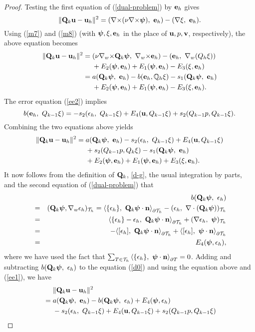 \documentclass[11pt]{amsart}
\newcommand{\bu}{{\bf u}}
\newcommand{\be}{{\bf e}}
\newcommand{\bv}{{\bf v}}
\newcommand{\bQ}{{\bf Q}}
\newcommand{\curl}{{\nabla\times}}
\newcommand{\cw}{{\nabla_w\times}}
\def\bpsi{{\boldsymbol{\psi}}}
\def\T{{\mathcal T}}
\def\Q{{\mathbb Q}}
\def\pT{{\partial T}}
\def\l{{\langle}}
\def\r{{\rangle}}
\def\bn{{\bf n}}
\def\ad#1{\begin{aligned}#1\end{aligned}}  \def\b#1{\mathbf{#1}} \def\hb#1{\hat{\mathbf{#1}}}
\def\a#1{\begin{align*}#1\end{align*}} \def\an#1{\begin{align}#1\end{align}} \def\t#1{\hbox{#1}}
\begin{document}
\begin{proof}
Testing the first equation of (\ref{dual-problem}) by $\be_h$ gives
\[
\|\bQ_k\bu-\bu_h\|^2=(\curl(\nu\curl\bpsi),\
\be_h)-(\nabla\xi,\ \be_h).
\]
Using (\ref{m7}) and (\ref{m8}) (with $\bpsi, \xi, \be_h$ in the
place of $\bu, p, \bv$, respectively), the above equation becomes
\a{ 
\|\bQ_k\bu-\bu_h\|^2  &= (\nu\cw\bQ_k\bpsi,\ \cw\be_h)-(\be_h,\ \nabla_w(Q_h\xi))\\
  & \quad \ +E_2(\bpsi, \be_h)+E_1(\bpsi, \be_h)-E_3(\xi,\be_h)\\&= a(\bQ_k \bpsi,\ \be_h)-b(\be_h,\Q_h\xi)-s_1(\bQ_k\bpsi,\ \be_h)\\
   &\quad \ +E_2(\bpsi, \be_h)+E_1(\bpsi, \be_h)-E_3(\xi,\be_h). }
The error equation (\ref{ee2}) implies
\[
b(\be_h,\ Q_{k-1}\xi)=-s_2(\epsilon_h,\ Q_{k-1}\xi)+E_4(\bu, Q_{k-1}\xi)+s_2(Q_{k-1}p,Q_{k-1}\xi).
\]
Combining the two equations above yields
\an{\ad{
\|\bQ_k\bu-\bu_h\|^2&= a(\bQ_k \bpsi,\ \be_h)-s_2(\epsilon_h,\ Q_{k-1}\xi)
     +E_4(\bu, Q_{k-1}\xi)\\
   &\quad \ +s_2(Q_{k-1}p,Q_k\xi) 
  - s_1(\bQ_k\bpsi,\ \be_h)\\
   &\quad\ +E_2(\bpsi, \be_h)+E_1(\bpsi, \be_h)+E_3(\xi,\be_h).}\label{d0} }
It now follows from the definition of $\bQ_k$, \eqref{d-g}, the usual integration by parts, and the
second equation of (\ref{dual-problem}) that
\begin{eqnarray*}
& & b(\bQ_k\bpsi,\ \epsilon_h)\\
&=&(\bQ_k\bpsi, \nabla_w\epsilon_h)_{\T_h}=\l \{\epsilon_h\},\ \bQ_k\bpsi\cdot\bn\r_{\partial\T_h}-(\epsilon_h,\ \nabla\cdot(\bQ_k\bpsi))_{\T_h}\\
&=&\l \{\epsilon_h\}-\epsilon_h,\ \bQ_k\bpsi\cdot\bn\r_{\partial\T_h}+(\nabla\epsilon_h,\ \bpsi)_{\T_h}\\
&=&-\l [\epsilon_h],\ \bQ_k\bpsi\cdot\bn\r_{\partial\T_h}+\l [\epsilon_h],\ \bpsi\cdot\bn\r_{\partial\T_h}\\
&=&E_4(\bpsi,\epsilon_h),
\end{eqnarray*}
where we have used the fact that $\sum_{T\in\T_h}\l \{\epsilon_h\},\ \bpsi\cdot\bn\r_\pT=0$.
Adding and subtracting $b(\bQ_k\bpsi,\ \epsilon_h)$ to the equation (\ref{d0}) and using the equation above and (\ref{ee1}), we have
\an{\ad{ &\quad\
\|\bQ_k\bu-\bu_h\|^2\\
&= a(\bQ_k\bpsi,\ \be_h)-b(\bQ_k\bpsi,\ \epsilon_h)+E_4(\bpsi,\epsilon_h)\\
&\quad\ - s_2(\epsilon_h,\ Q_{k-1}\xi)+E_4(\bu, Q_{k-1}\xi)+s_2(Q_{k-1}p,Q_{k-1}\xi) \\
}}
\end{proof}
\end{document}
